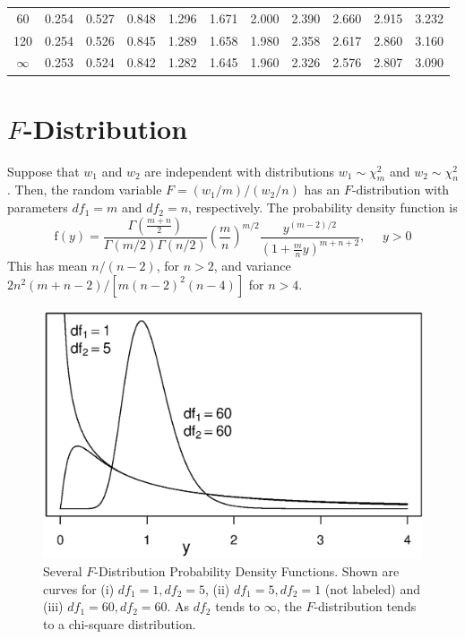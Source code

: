 \begin{table}[h]
\begin{tabular}{crrrrrrrrrr}
\hline
        60 &      0.254 &      0.527 &      0.848 &      1.296 &      1.671 &      2.000 &      2.390 &      2.660 &      2.915 &      3.232 \\
       120 &      0.254 &      0.526 &      0.845 &      1.289 &      1.658 &      1.980 &      2.358 &      2.617 &      2.860 &      3.160 \\
       $\infty$ &      0.253 &      0.524 &      0.842 &      1.282 &      1.645 &      1.960 &      2.326 &      2.576 &      2.807 &      3.090 \\
\hline
\end{tabular}
\end{table}



\newpage
\section{$F$-Distribution}

Suppose that $w_1$ and $w_2$ are independent with distributions $w_1
\sim \chi_m^2$ and $w_2 \sim \chi_n^2$. Then, the random variable $F
= (w_1/m) / (w_2/n)$ has an $F$-distribution with parameters
$df_1=m$ and $df_2=n$, respectively. The probability density
function is
\begin{equation*}
\mathrm{f}(y)= \frac{\Gamma \left(\frac{m+n}{2} \right)}
{\Gamma(m/2)\Gamma(n/2)} \left( \frac{m}{n} \right)^{m/2}
\frac{y^{(m-2)/2}} {\left( 1+\frac{m}{n}y \right)^{m+n+2}} ,
~~~~~~y>0
\end{equation*}
This has mean $n/(n-2)$, for $n>2$, and variance
$2n^2(m+n-2)/[m(n-2)^2(n-4)]$ for $n>4$.


\begin{figure}[htp]
  \begin{center}
    \includegraphics[scale=.6]{Appendices/FAppendF.eps}
    \caption{ \small  Several $F$-Distribution Probability Density Functions.
    Shown are curves for (i) $df_1=1, df_2=5$, (ii)
    $df_1=5, df_2=1$ (not labeled) and (iii) $df_1=60, df_2=60$. As $df_2$ tends to $\infty$,
    the $F$-distribution tends to a chi-square distribution.}
  \end{center}
\end{figure}


